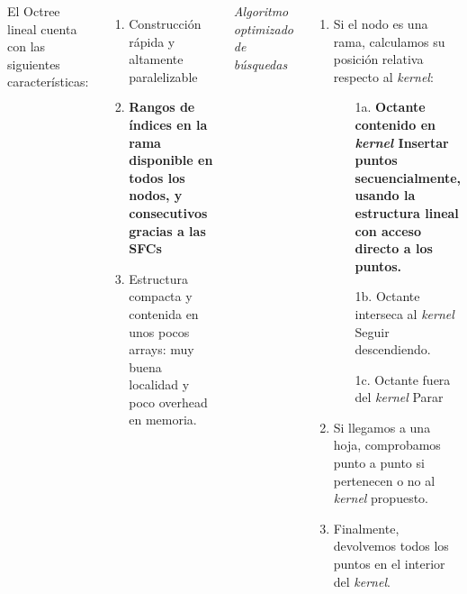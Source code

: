 \documentclass[aspectratio=169]{beamer}
\begin{document}
\begin{frame}
    \begin{columns}
        El Octree lineal cuenta con las siguientes características:
        \begin{enumerate}
            \item Construcción rápida y altamente paralelizable
            \item \textbf{Rangos de índices en la rama disponible en todos los nodos, y consecutivos gracias a las SFCs}
            \item Estructura compacta y contenida en unos pocos arrays: muy buena localidad y poco overhead en memoria.
        \end{enumerate}
        \textit{Algoritmo optimizado de búsquedas}
        \vspace{1em}
        \begin{enumerate}
            \item Si el nodo es una rama, calculamos su posición relativa respecto al \textit{kernel}:
              \begin{enumerate}
                    \item[1a.] \textbf{Octante contenido en \textit{kernel} \textrightarrow\: Insertar puntos secuencialmente, usando la estructura lineal con acceso directo a los puntos.}
                   \item[1b.] Octante interseca al \textit{kernel} \textrightarrow\: Seguir descendiendo.
                   \item[1c.] Octante fuera del \textit{kernel} \textrightarrow\:  Parar
              \end{enumerate}
            \item Si llegamos a una hoja, comprobamos punto a punto si pertenecen o no al \textit{kernel} propuesto. 
            \item Finalmente, devolvemos todos los puntos en el interior del \textit{kernel}.
        \end{enumerate}
    \end{columns}

\end{frame}
\end{document}
